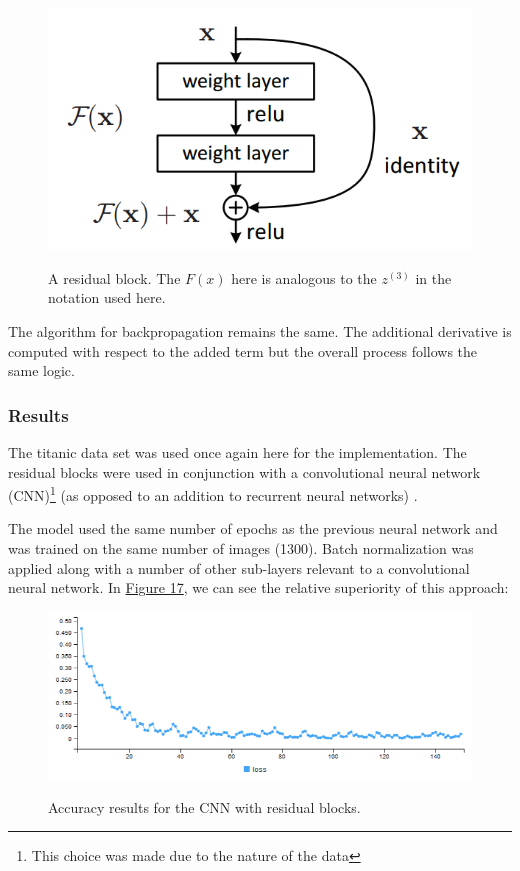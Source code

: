 \documentclass{article}
\begin{document}
\begin{figure}[h!]
  \centering
  \includegraphics[scale = 0.6]{block.png}
  \label{fig:block}
  \caption{A residual block. The $F(x)$ here is analogous to the $z^{(3)}$ in the notation used here. \cite{res1}}
\end{figure}

\noindent The algorithm for backpropagation remains the same. The additional derivative is computed with respect to the added term but the overall process follows the same logic.

\subsubsection{Results}

\noindent The titanic data set was used once again here for the implementation. The residual blocks were used in conjunction with a convolutional neural network (CNN)\footnote{This choice was made due to the nature of the data} (as opposed to an addition to recurrent neural networks) \cite{resnetCode}. 

\noindent The model used the same number of epochs as the previous neural network and was trained on the same number of images (1300). Batch normalization was applied along with a number of other sub-layers relevant to a convolutional neural network. In \hyperref[fig:acc_resnn]{Figure 17}, we can see the relative superiority of this approach:

\begin{figure}[h!]
  \centering
  \includegraphics[scale = 0.6]{accuracy_res3.png}
  \label{fig:acc_resnn}
  \caption{Accuracy results for the CNN with residual blocks.}
\end{figure}
\end{document}
